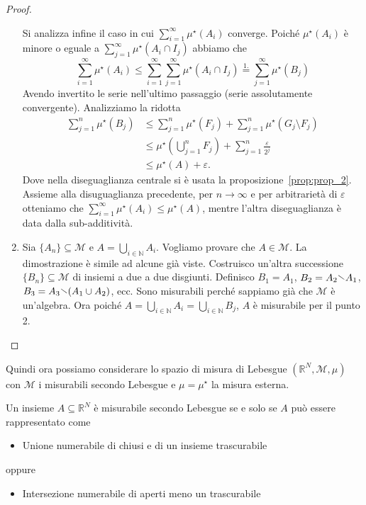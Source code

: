 \begin{proof}
\begin{enumerate}[label = \arabic*.]
        Si analizza infine il caso in cui \(\sum_{i=1}^{\infty} \mu^\star(A_{i}) \)
        converge. Poiché \(\mu^\star(A_{i}) \) è minore o eguale a \( \sum_{j=1}^{\infty}
        \mu^\star(A_{i} \cap I_{j}) \) abbiamo che 
        \[
            \sum_{i=1}^{\infty} \mu^\star(A_{i}) \le \sum_{i=1}^{\infty}
            \sum_{j=1}^{\infty} \mu^\star(A_{i} \cap I_{j}) \overset{1.}{=}
            \sum_{j=1}^{\infty} \mu^\star(B_{j})
        \]
        Avendo invertito le serie nell'ultimo passaggio (serie assolutamente
        convergente). Analizziamo la ridotta
        \[
                \begin{aligned}
                \sum_{j=1}^{n} \mu^\star(B_{j}) 
                &\le \sum_{j=1}^{n} \mu^\star(F_{j}) 
                    + \sum_{j=1}^{n} \mu^\star(G_{j} \setminus F_{j}) \\
                &\le \mu^\star\left( \bigcup_{j = 1}^{n} F_{j} \right) 
                    + \sum_{j=1}^{n} \frac{\varepsilon}{2^{j}} \\
                &\le \mu^\star(A) + \varepsilon.
                \end{aligned}
        \]
        Dove nella diseguaglianza centrale si è usata la
        proposizione~\ref{prop:prop_2}. Assieme alla disuguaglianza precedente,
        per \(n\to \infty\) e per arbitrarietà di \(\varepsilon\)  otteniamo che
        \(\sum_{i=1}^{\infty} \mu^\star(A_{i}) \le \mu^\star(A)\), mentre
        l'altra diseguaglianza è data dalla sub-additività.
    \item Sia \(\{A_{n}\} \subseteq   \mathcal{M}\) e \(A = \bigcup_{i \in
        \mathbb{N}} A_{i} \). Vogliamo provare che \(A \in \mathcal{M}\). La
        dimostrazione è simile ad alcune già viste.
        Costruisco un'altra successione \(\{B_{n}\} \subseteq \mathcal{M}\) di
        insiemi a due a due disgiunti. Definisco \(B_{1} = A_{1}\), \(B_{2} =
        A_{2} \sminus A_{1}\), \(B_{3} = A_{3} \sminus (A_{1} \cup A_{2})\),
        ecc. Sono misurabili perché sappiamo già che \(\mathcal{M}\) è
        un'algebra. Ora poiché 
        \(
            A = \bigcup_{i \in \mathbb{N}} A_{i} = \bigcup_{i \in \mathbb{N}} B_{j}
        \), \(A\) è misurabile per il punto 2.
\end{enumerate}
\end{proof}
Quindi ora possiamo considerare lo spazio di misura di Lebesgue \(\left(
\mathbb{R}^{N}, \mathcal{M}, \mu \right) \) con \(\mathcal{M}\) i
misurabili secondo Lebesgue e \(\mu = \mu^\star\) la misura esterna.
\begin{theorem}
    Un insieme \(A \subseteq \mathbb{R}^{N} \) è misurabile secondo Lebesgue se e solo se \(A\)
    può essere rappresentato come
\begin{itemize}
    \item Unione numerabile di chiusi e di un insieme trascurabile
\end{itemize}
oppure 
\begin{itemize}
    \item Intersezione numerabile di aperti meno un trascurabile
\end{itemize}
\end{theorem}
